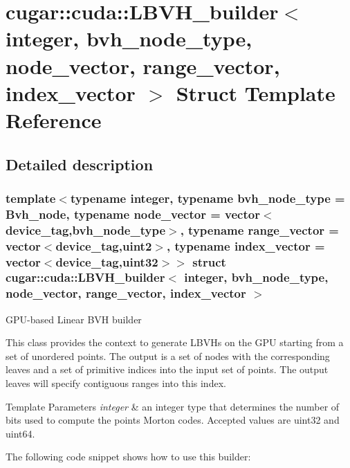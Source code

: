 \hypertarget{structcugar_1_1cuda_1_1_l_b_v_h__builder}{}\section{cugar\+:\+:cuda\+:\+:L\+B\+V\+H\+\_\+builder$<$ integer, bvh\+\_\+node\+\_\+type, node\+\_\+vector, range\+\_\+vector, index\+\_\+vector $>$ Struct Template Reference}
\label{structcugar_1_1cuda_1_1_l_b_v_h__builder}


\subsection{Detailed description}
\subsubsection*{template$<$typename integer, typename bvh\+\_\+node\+\_\+type = Bvh\+\_\+node, typename node\+\_\+vector = vector$<$device\+\_\+tag,bvh\+\_\+node\+\_\+type$>$, typename range\+\_\+vector = vector$<$device\+\_\+tag,uint2$>$, typename index\+\_\+vector = vector$<$device\+\_\+tag,uint32$>$$>$\newline
struct cugar\+::cuda\+::\+L\+B\+V\+H\+\_\+builder$<$ integer, bvh\+\_\+node\+\_\+type, node\+\_\+vector, range\+\_\+vector, index\+\_\+vector $>$}

G\+P\+U-\/based Linear B\+VH builder

This class provides the context to generate L\+B\+V\+Hs on the G\+PU starting from a set of unordered points. The output is a set of nodes with the corresponding leaves and a set of primitive indices into the input set of points. The output leaves will specify contiguous ranges into this index.


\begin{DoxyTemplParams}{Template Parameters}
{\em integer} & an integer type that determines the number of bits used to compute the points\textquotesingle{} Morton codes. Accepted values are uint32 and uint64.\\
\hline
\end{DoxyTemplParams}
The following code snippet shows how to use this builder\+:


